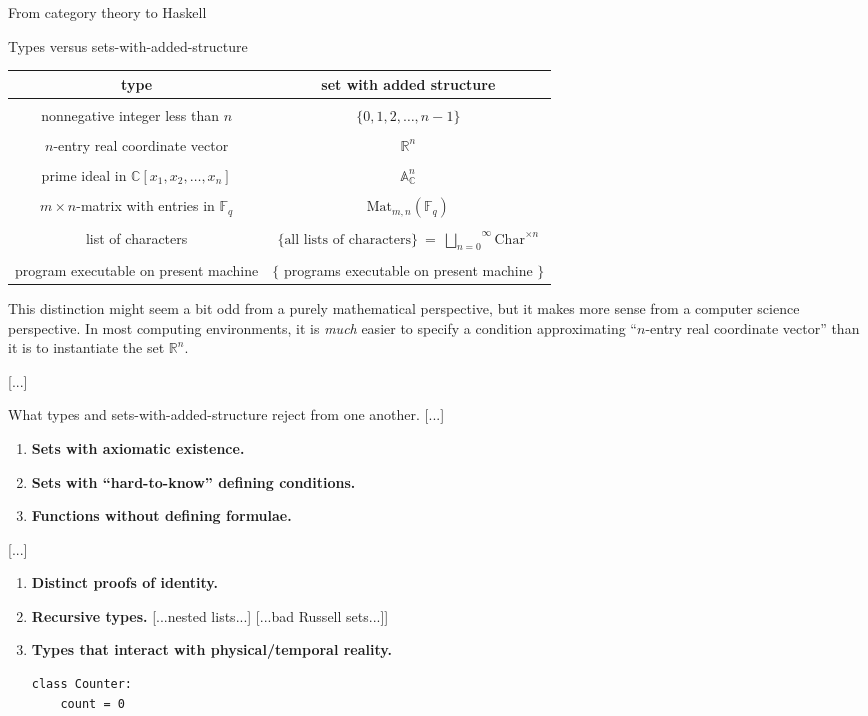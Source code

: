 \documentclass[11pt, a4paper]{article}
\begin{document}
\begin{section}{From category theory to Haskell}
\begin{subsection}{Types versus sets-with-added-structure}
\begin{center}
\begin{tabular}{c|c}
{\bf type} & {\bf set with added structure}
\\[4pt]
\hline\hline
\\[-10pt]
nonnegative integer less than $n$ & $\{0,1,2,\dots,n-1\}$
\\[4pt]
\hline
\\[-10pt]
$n$-entry real coordinate vector
&
$\mathbb{R}^n$
\\[4pt]
\hline
\\[-10pt]
prime ideal in $\mathbb{C}[x_1,x_2,\dots,x_n]$
&
$\mathbb{A}^{\!n}_{\mathbb{C}}$
\\[4pt]
\hline
\\[-10pt]
$m\!\times\!n$-matrix with entries in $\mathbb{F}_{\!q}$
&
$\text{Mat}_{m,n}(\mathbb{F}_{\!q})$
\\[4pt]
\hline
\\[-10pt]
list of characters
&
$\{\text{all lists of characters}\}\ =\ \overset{\infty}{\underset{n=0}{\bigsqcup}}\text{Char}^{\times n}$
\\[4pt]
\hline
\\[-10pt]
program executable on present machine
&
$\{\!$
programs executable on present machine
$\!\}$
\\[4pt]
\end{tabular}

\end{center}

\noindent
This distinction might seem a bit odd from a purely mathematical perspective, but it makes more sense from a computer science perspective. In most computing environments, it is {\em much} easier to specify a condition approximating ``$n$-entry real coordinate vector'' than it is to instantiate the set $\mathbb{R}^{n}$.

[...]

\begin{subsubsection}{What types and sets-with-added-structure reject from one another.}
[...]

\begin{enumerate}
\item
{\bf Sets with axiomatic existence.}
\item
{\bf Sets with ``hard-to-know'' defining conditions.}
\item
{\bf Functions without defining formulae.}
\end{enumerate}

[...]

\begin{enumerate}
\item
{\bf Distinct proofs of identity.}
\item
{\bf Recursive types.}
[...nested lists...] [...bad Russell sets...]]
\item
{\bf Types that interact with physical/temporal reality.}
    \begin{verbatim}
class Counter:
    count = 0


\end{verbatim}
\end{enumerate}
\end{subsubsection}
\end{subsection}
\end{section}
\end{document}
